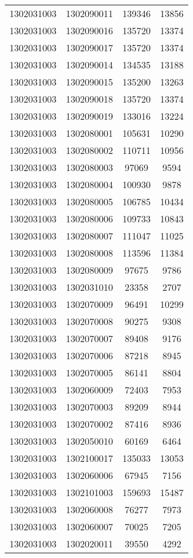 \begin{longtable}{llcc}
1302031003 & 1302090011 & 139346 & 13856\\
1302031003 & 1302090016 & 135720 & 13374\\
1302031003 & 1302090017 & 135720 & 13374\\
1302031003 & 1302090014 & 134535 & 13188\\
1302031003 & 1302090015 & 135200 & 13263\\
1302031003 & 1302090018 & 135720 & 13374\\
1302031003 & 1302090019 & 133016 & 13224\\
1302031003 & 1302080001 & 105631 & 10290\\
1302031003 & 1302080002 & 110711 & 10956\\
1302031003 & 1302080003 & 97069 & 9594\\
1302031003 & 1302080004 & 100930 & 9878\\
1302031003 & 1302080005 & 106785 & 10434\\
1302031003 & 1302080006 & 109733 & 10843\\
1302031003 & 1302080007 & 111047 & 11025\\
1302031003 & 1302080008 & 113596 & 11384\\
1302031003 & 1302080009 & 97675 & 9786\\
1302031003 & 1302031010 & 23358 & 2707\\
1302031003 & 1302070009 & 96491 & 10299\\
1302031003 & 1302070008 & 90275 & 9308\\
1302031003 & 1302070007 & 89408 & 9176\\
1302031003 & 1302070006 & 87218 & 8945\\
1302031003 & 1302070005 & 86141 & 8804\\
1302031003 & 1302060009 & 72403 & 7953\\
1302031003 & 1302070003 & 89209 & 8944\\
1302031003 & 1302070002 & 87416 & 8936\\
1302031003 & 1302050010 & 60169 & 6464\\
1302031003 & 1302100017 & 135033 & 13053\\
1302031003 & 1302060006 & 67945 & 7156\\
1302031003 & 1302101003 & 159693 & 15487\\
1302031003 & 1302060008 & 76277 & 7973\\
1302031003 & 1302060007 & 70025 & 7205\\
1302031003 & 1302020011 & 39550 & 4292\\

\end{longtable}
